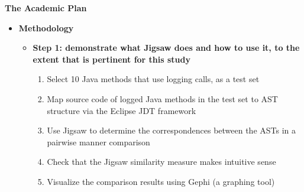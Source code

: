 \documentclass{article}
\newcommand{\cmark}{\ding{51}}%
\newcommand{\pmark}{\ding{59}}%
\newcommand{\bld}{\textbf}
\begin{document}
\begin{titlepage}
   \begin{center}
      \Large\textbf{The Academic Plan}
   \end{center}
\end{titlepage}

\begin{itemize} [leftmargin=.1in]
\item \bld{Methodology} \pmark {}
\begin{itemize} [leftmargin=.1in]

\item \bld{Step 1: demonstrate what Jigsaw does and how to use it, to the extent that is pertinent for this study}
\begin{enumerate}
\item Select 10 Java methods that use logging calls, as a test set \cmark
\item Map source code of logged Java methods in the test set to AST structure via the Eclipse JDT framework \cmark 
\item Use Jigsaw to determine the correspondences between the ASTs in a pairwise manner comparison \cmark  %
\item  Check that the Jigsaw similarity measure makes intuitive sense \cmark 
\item Visualize the comparison results using Gephi (a graphing tool) \cmark 
\end{enumerate}



\end{itemize}
\end{itemize}
\end{document}
